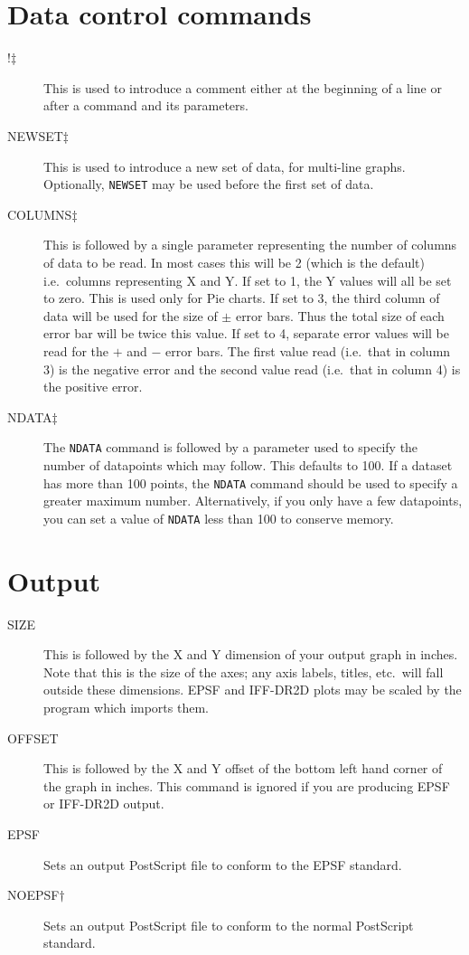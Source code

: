 \section{Data control commands}
\begin{description}
\item[!$\ddag$] This is used to introduce a comment either at the beginning of a 
line or after a command and its parameters.
\item[NEWSET$\ddag$] This is used to introduce a new set of data, for multi-line 
graphs. Optionally, {\tt NEWSET} may be used before the first set of data.
\item[COLUMNS$\ddag$] This is followed by a single parameter representing the 
number of columns of data to be read. In most cases this will be 2 (which is the 
default) i.e.\ columns representing X and Y. If set to 1, the Y values will all be 
set to zero. This is used only for Pie charts. If set to 3, the third column of data 
will be used for the size of $\pm$ error bars. Thus the total size of each error 
bar will be twice this value. If set to 4, separate error values will be read for
the $+$ and $-$ error bars. The first value read (i.e.\ that in column 3) is the
negative error and the second value read (i.e.\ that in column 4) is the positive
error.
\item[NDATA$\ddag$] The {\tt NDATA} command is followed by a parameter used to specify 
the number of datapoints which may 
follow. This defaults to 100. If a dataset has more than 100 points, the {\tt NDATA}
command should be used to specify a greater maximum number. Alternatively, if you 
only have a few datapoints, you can set a value of {\tt NDATA} less than 100 
to conserve memory.
\end{description}

\section{Output}
\begin{description}
\item[SIZE] This is followed by the X and Y dimension of your output graph
in inches. Note that this is the size of the axes; any axis  labels, titles, etc.\ 
will fall outside these dimensions. EPSF and IFF-DR2D plots may be scaled by the 
program which imports them.
\item[OFFSET] This is followed by the X and Y offset of the bottom left hand 
corner of the graph in inches. This command is ignored if you are producing EPSF or 
IFF-DR2D output.
\item[EPSF] Sets an output PostScript file to conform to the EPSF standard.
\item[NOEPSF$\dag$] Sets an output PostScript file to conform to the normal 
PostScript standard.
\end{description}

